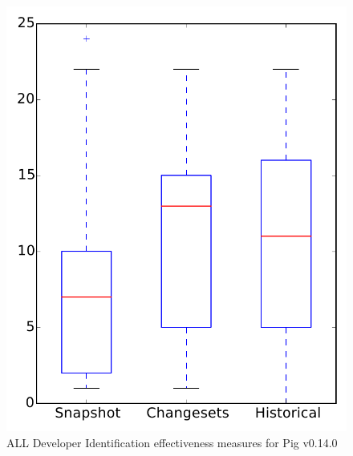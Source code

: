 
\begin{figure}
\centering
\includegraphics[height=0.4\textheight]{figures/dit/all_pig}
\caption{ALL Developer Identification effectiveness measures for Pig v0.14.0}
\label{fig:dit:all:pig}
\end{figure}
